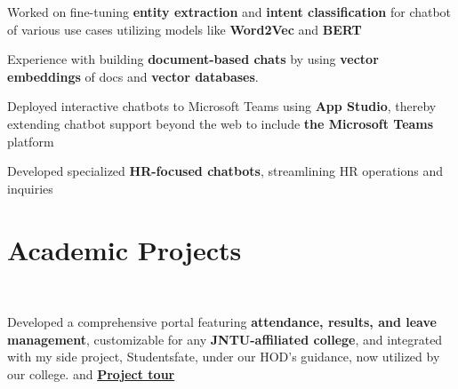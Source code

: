 \documentclass{deedy-resume-openfont}
\begin{document}
\begin{minipage}[t]{0.66\textwidth}
\descript{  }
\begin{tightemize}
\item  Worked on fine-tuning \textbf{entity extraction} and \textbf{intent classification} for chatbot of various use cases utilizing models like \textbf{Word2Vec} and \textbf{BERT}
\item Experience with building \textbf{document-based chats} by using \textbf{vector embeddings} of docs and \textbf{vector databases}.
\item Deployed interactive chatbots to Microsoft Teams using \textbf{App Studio}, thereby extending chatbot support beyond the web to include \textbf{the Microsoft Teams} platform
\end{tightemize}

\begin{tightemize}
\item Developed specialized \textbf{HR-focused chatbots}, streamlining HR operations and inquiries
\end{tightemize}
\sectionsep


\section{Academic Projects}
\\
\begin{tightemize}
\item Developed a comprehensive portal featuring \textbf{attendance, results, and leave management}, customizable for any \textbf{JNTU-affiliated college}, and integrated with my side project, Studentsfate, under our HOD's guidance, now utilized by our college.  and \textbf{\href{https://www.youtube.com/watch?v=SD9KdLAw1OI}{Project tour}}
\end{tightemize}
\sectionsep


\end{minipage}
\end{document}
